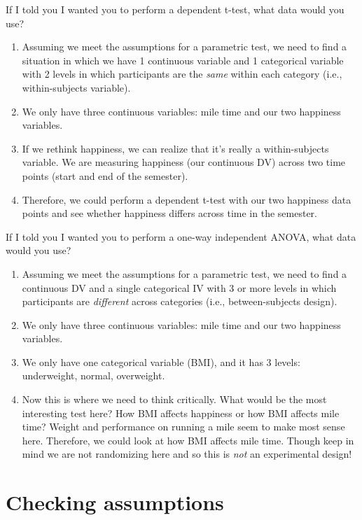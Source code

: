 \documentclass[
]{book}
\providecommand{\tightlist}{%
  \setlength{\itemsep}{0pt}\setlength{\parskip}{0pt}}
\begin{document}
If I told you I wanted you to perform a dependent t-test, what data would you use?

\begin{enumerate}
\def\labelenumi{\arabic{enumi}.}
\tightlist
\item
  Assuming we meet the assumptions for a parametric test, we need to find a situation in which we have 1 continuous variable and 1 categorical variable with 2 levels in which participants are the \emph{same} within each category (i.e., within-subjects variable).
\item
  We only have three continuous variables: mile time and our two happiness variables.
\item
  If we rethink happiness, we can realize that it's really a within-subjects variable. We are measuring happiness (our continuous DV) across two time points (start and end of the semester).
\item
  Therefore, we could perform a dependent t-test with our two happiness data points and see whether happiness differs across time in the semester.
\end{enumerate}

If I told you I wanted you to perform a one-way independent ANOVA, what data would you use?

\begin{enumerate}
\def\labelenumi{\arabic{enumi}.}
\tightlist
\item
  Assuming we meet the assumptions for a parametric test, we need to find a continuous DV and a single categorical IV with 3 or more levels in which participants are \emph{different} across categories (i.e., between-subjects design).
\item
  We only have three continuous variables: mile time and our two happiness variables.
\item
  We only have one categorical variable (BMI), and it has 3 levels: underweight, normal, overweight.
\item
  Now this is where we need to think critically. What would be the most interesting test here? How BMI affects happiness or how BMI affects mile time? Weight and performance on running a mile seem to make most sense here. Therefore, we could look at how BMI affects mile time. Though keep in mind we are not randomizing here and so this is \emph{not} an experimental design!
\end{enumerate}

\hypertarget{checking-assumptions}{%
\section{Checking assumptions}\label{checking-assumptions}}
\end{document}
